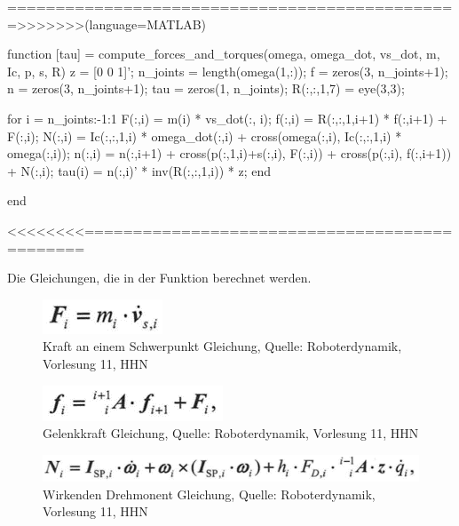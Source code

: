 ===============================================>>>>>>>(language=MATLAB)

function [tau] = compute_forces_and_torques(omega, omega_dot, vs_dot, m, Ic, p, s, R)
	z = [0 0 1]';
	n_joints = length(omega(1,:));
	f = zeros(3, n_joints+1);
	n = zeros(3, n_joints+1);
	tau = zeros(1, n_joints);
	R(:,:,1,7) = eye(3,3);

	for i = n_joints:-1:1
		F(:,i) = m(i) * vs_dot(:, i);
		f(:,i) = R(:,:,1,i+1) * f(:,i+1) + F(:,i);
		N(:,i) = Ic(:,:,1,i) * omega_dot(:,i) + cross(omega(:,i), Ic(:,:,1,i) * omega(:,i));
		n(:,i) = n(:,i+1) + cross(p(:,1,i)+s(:,i), F(:,i)) + cross(p(:,i), f(:,i+1)) + N(:,i);
		tau(i) = n(:,i)' * inv(R(:,:,1,i)) * z;
	end

end

<<<<<<<<==============================================

Die Gleichungen, die in der Funktion berechnet werden.

	\begin{figure}[!htbp]
		\centering
		\includegraphics[width=1\linewidth]{grafic/Fi_gleichung}
		\caption{Kraft an einem Schwerpunkt Gleichung, Quelle: Roboterdynamik, Vorlesung 11, HHN}
		\label{fig:Fi_gleichung}
	\end{figure}

	\begin{figure}[!htbp]
		\centering
		\includegraphics[width=1\linewidth]{grafic/klein_fi_gleichung}
		\caption{Gelenkkraft Gleichung, Quelle: Roboterdynamik, Vorlesung 11, HHN}
		\label{fig:klein_fi_gleichung}
	\end{figure}

	\begin{figure}[!htbp]
		\centering
		\includegraphics[width=1\linewidth]{grafic/gross_n_gleichung}
		\caption{Wirkenden Drehmonent Gleichung, Quelle: Roboterdynamik, Vorlesung 11, HHN}
		\label{fig:gross_n_gleichung}
	\end{figure}

